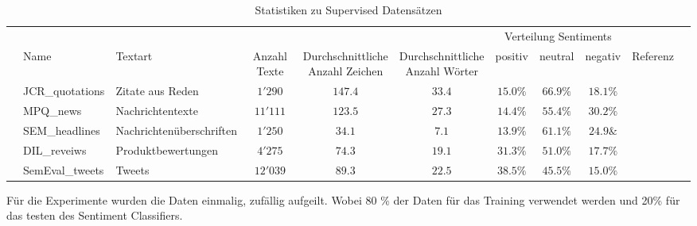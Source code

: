 \begin{table}[h]
	\begin{adjustbox}{max width=\textwidth}
		\begin{tabular}{@{}lllcccccccl@{}}
			\toprule
			& & & & & & \multicolumn{3}{c}{Verteilung Sentiments} &\\
			\cmidrule(r){7-9}
			& Name & Textart & Anzahl Texte & \specialcell{Durchschnittliche\\Anzahl Zeichen} & \specialcell{Durchschnittliche\\Anzahl Wörter} & positiv & neutral & negativ & Referenz &\\ \midrule
			& JCR{\_}quotations & Zitate aus Reden & $1'290$ & $147.4$ & $33.4$ & $15.0\%$ & $66.9\%$ & $18.1\%$ & \cite{cieliebak2013potential}\\
			& MPQ{\_}news & Nachrichtentexte & $11'111$ & $123.5$ & $27.3$ & $14.4\%$ & $55.4\%$ & $30.2\%$ & \cite{cieliebak2013potential}\\
			& SEM{\_}headlines & Nachrichtenüberschriften & $1'250$ & $34.1$ & $7.1$ & $13.9\%$ & $61.1\%$ & $24.9\&$ & \cite{cieliebak2013potential}\\
			& DIL{\_}reveiws & Produktbewertungen & $4'275$ & $74.3$ & $19.1$ & $31.3\%$ & $51.0\%$ & $17.7\%$ & \cite{cieliebak2013potential}\\
			& SemEval{\_}tweets & Tweets & $12'039$ & $89.3$ & $22.5$ & $38.5\%$ & $45.5\%$ & $15.0\%$ & \cite{SemEval:2016:task4}\\
			\bottomrule
		\end{tabular}
	\end{adjustbox}
	\caption{Statistiken zu Supervised Datensätzen}
\end{table}

Für die Experimente wurden die Daten einmalig, zufällig aufgeilt. Wobei 80 \% der Daten für das Training verwendet werden und 20\% für das testen des Sentiment Classifiers.

